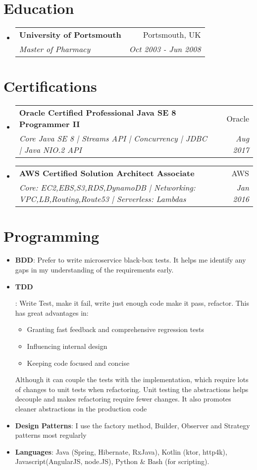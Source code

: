 \documentclass[letterpaper,11pt]{article}
\makeatletter
\newcommand{\resumeItem}[2]{
  \item\small{
    \textbf{#1}{: #2 \vspace{-2pt}}
  }
}
\newcommand{\resumeSubheading}[4]{
  \vspace{-1pt}\item
    \begin{tabular*}{0.97\textwidth}{l@{\extracolsep{\fill}}r}
      \textbf{#1} & #2 \\
      \textit{\small#3} & \textit{\small #4} \\
    \end{tabular*}\vspace{-5pt}
}
\newcommand{\resumeSubItem}[2]{\resumeItem{#1}{#2}\vspace{-4pt}}
\newcommand{\resumeSubHeadingListStart}{\begin{itemize}[leftmargin=*]}
\newcommand{\resumeSubHeadingListEnd}{\end{itemize}}
\makeatother
\begin{document}
\section{Education}
    \resumeSubHeadingListStart
        \resumeSubheading
        {University of Portsmouth}{Portsmouth, UK}
        {Master of Pharmacy}{Oct 2003 - Jun 2008}
    \resumeSubHeadingListEnd
    
\section{Certifications}
    \resumeSubHeadingListStart
        \resumeSubheading
        {Oracle Certified Professional Java SE 8 Programmer II}{Oracle}
        {Core Java SE 8 | Streams API | Concurrency | JDBC | Java NIO.2 API}{Aug 2017}
        \resumeSubheading
        {AWS Certified Solution Architect Associate}{AWS}
        {Core: EC2,EBS,S3,RDS,DynamoDB | Networking: VPC,LB,Routing,Route53 | Serverless: Lambdas}{Jan 2016}
    \resumeSubHeadingListEnd
    
\section{Programming}
  \resumeSubHeadingListStart
    \resumeSubItem{BDD}
      { Prefer to write microservice black-box tests. It helps me identify any gaps in my understanding of the requirements early. }
    \resumeSubItem{TDD}
      { Write Test, make it fail, write just enough code make it pass, refactor. This has great advantages in:
        \begin{itemize}
          \item Granting fast feedback and comprehensive regression tests
          \item Influencing internal design
          \item Keeping code focused and concise
        \end{itemize}
        Although it can couple the tests with the implementation, which require lots of changes to unit tests when refactoring. Unit testing the abstractions helps decouple and makes refactoring require fewer changes. It also promotes cleaner abstractions in the production code}
    \resumeSubItem{Design Patterns}
      { I use the factory method, Builder, Observer and Strategy patterns most regularly}
    \resumeSubItem{Languages}
      {Java (Spring, Hibernate, RxJava), Kotlin (ktor, http4k), Javascript(AngularJS, node.JS), Python \& Bash (for scripting).}
  \resumeSubHeadingListEnd
\end{document}
